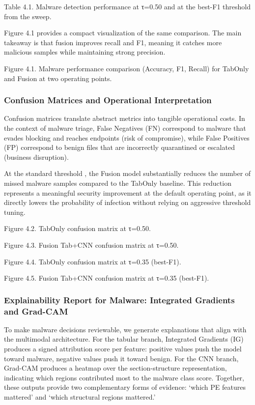 \documentclass[conference]{IEEEtran}
\begin{document}
Table 4.1. Malware detection performance at τ=0.50 and at the best-F1 threshold from the sweep.

Figure 4.1 provides a compact visualization of the same comparison. The main takeaway is that fusion improves recall and F1, meaning it catches more malicious samples while maintaining strong precision.

Figure 4.1. Malware performance comparison (Accuracy, F1, Recall) for TabOnly and Fusion at two operating points.

\subsubsection{Confusion Matrices and Operational Interpretation}

Confusion matrices translate abstract metrics into tangible operational costs. In the context of malware triage, False Negatives (FN) correspond to malware that evades blocking and reaches endpoints (risk of compromise), while False Positives (FP) correspond to benign files that are incorrectly quarantined or escalated (business disruption).

At the standard threshold , the Fusion model substantially reduces the number of missed malware samples compared to the TabOnly baseline. This reduction represents a meaningful security improvement at the default operating point, as it directly lowers the probability of infection without relying on aggressive threshold tuning.

Figure 4.2. TabOnly confusion matrix at τ=0.50.

Figure 4.3. Fusion Tab+CNN confusion matrix at τ=0.50.

Figure 4.4. TabOnly confusion matrix at τ=0.35 (best-F1).

Figure 4.5. Fusion Tab+CNN confusion matrix at τ=0.35 (best-F1).

\subsubsection{Explainability Report for Malware: Integrated Gradients and Grad-CAM}

To make malware decisions reviewable, we generate explanations that align with the multimodal architecture. For the tabular branch, Integrated Gradients (IG) produces a signed attribution score per feature: positive values push the model toward malware, negative values push it toward benign. For the CNN branch, Grad-CAM produces a heatmap over the section-structure representation, indicating which regions contributed most to the malware class score. Together, these outputs provide two complementary forms of evidence: ‘which PE features mattered’ and ‘which structural regions mattered.’
\end{document}
